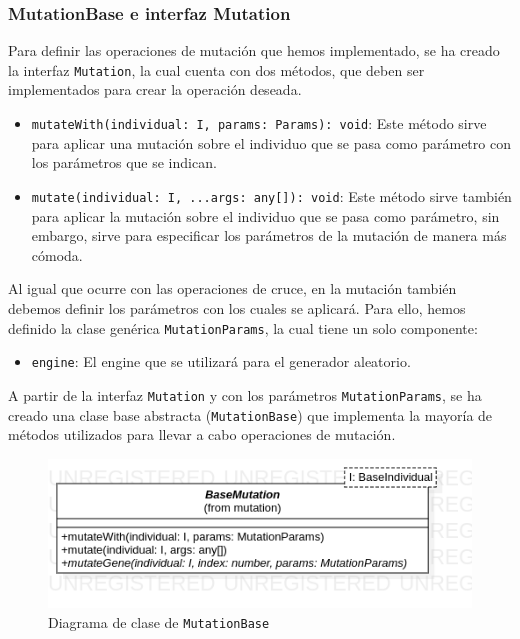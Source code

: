 \subsubsection{MutationBase e interfaz Mutation}

Para definir las operaciones de mutación que hemos implementado, se ha creado la interfaz \texttt{Mutation}, la cual cuenta con dos métodos, que deben ser implementados para crear la operación deseada.

\begin{itemize}
    \item \texttt{mutateWith(individual: I, params: Params): void}: Este método sirve para aplicar una mutación sobre el individuo que se pasa como parámetro con los parámetros que se indican.
    \item \texttt{mutate(individual: I, ...args: any[]): void}: Este método sirve también para aplicar la mutación sobre el individuo que se pasa como parámetro, sin embargo, sirve para especificar los parámetros de la mutación de manera más cómoda.
\end{itemize}

Al igual que ocurre con las operaciones de cruce, en la mutación también debemos definir los parámetros con los cuales se aplicará. Para ello, hemos definido la clase genérica \texttt{MutationParams}, la cual tiene un solo componente:

\begin{itemize}
    \item \texttt{engine}: El engine que se utilizará para el generador aleatorio.
\end{itemize}

A partir de la interfaz \texttt{Mutation} y con los parámetros \texttt{MutationParams}, se ha creado una clase base abstracta (\texttt{MutationBase}) que implementa la mayoría de métodos utilizados para llevar a cabo operaciones de mutación.\\

\begin{figure}[ht]
    \centering
    \includegraphics[scale=0.4]{mem/images/cap-4/4.2.7(Mutation)/BaseMutation.png}
    \caption{Diagrama de clase de \texttt{MutationBase}}
    \label{fig:my_label}
\end{figure}

